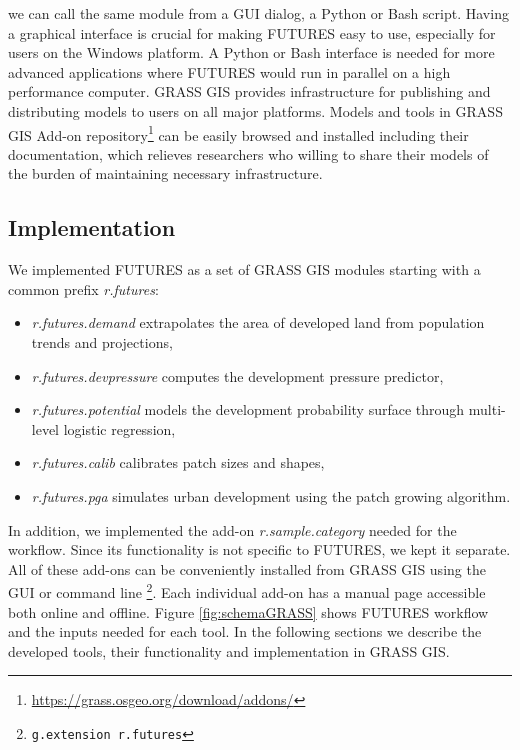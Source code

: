 \documentclass{isprs}
\begin{document}
we can call the same module from a GUI dialog, a Python or Bash script.
Having a graphical interface is crucial for making FUTURES easy to use,
especially for users on the Windows platform. 
A Python or Bash interface is needed for more advanced applications where FUTURES would run in parallel on a high performance computer.
%
GRASS GIS provides infrastructure for publishing and distributing
models to users on all major platforms.
%
Models and tools in GRASS GIS Add-on repository\footnote{\url{https://grass.osgeo.org/download/addons/}}
can be easily browsed and installed including their documentation,
which relieves researchers who willing to share their models of the burden of maintaining necessary infrastructure.




\subsection{Implementation}
We implemented FUTURES as a set of GRASS GIS modules starting with a common prefix \emph{r.futures}:
\begin{itemize}[noitemsep,nolistsep]
 \item \emph{r.futures.demand} extrapolates the area of developed land from population trends and projections,
 \item \emph{r.futures.devpressure} computes the development pressure predictor,
 \item \emph{r.futures.potential} models the development probability surface through multi-level logistic regression,
 \item \emph{r.futures.calib} calibrates patch sizes and shapes,
 \item \emph{r.futures.pga} simulates urban development using the patch growing algorithm.
\end{itemize}
In addition, we implemented the add-on \emph{r.sample.category} needed for the workflow. 
Since its functionality is not specific to FUTURES, we kept it separate.
All of these add-ons can be conveniently installed from GRASS GIS using the GUI or command line%
\footnote{\texttt{g.extension r.futures}}. 
Each individual add-on has a manual page accessible both online and offline.
Figure \ref{fig:schemaGRASS} shows FUTURES workflow and the inputs needed for each tool.
In the following sections we describe the developed tools, their functionality and implementation in GRASS GIS.
\end{document}
